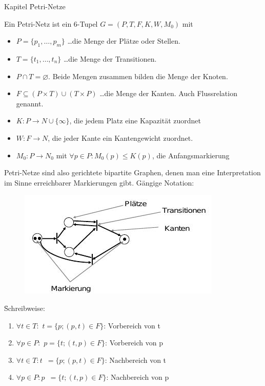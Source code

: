 \begin{chapter}{Kapitel}
\f{Petri-Netze}
\vspace*{3pt}

\noindent {}
Ein Petri-Netz ist ein 6-Tupel $G = (P,T,F,K,W,M_0)$ mit 
\begin{itemize}
 \item $P = \{p_1, \dots , p_m\}$ \dots die Menge der Plätze oder Stellen.
 \item $T = \{t_1, \dots , t_n\}$ \dots die Menge der Transitionen.
 \item $P \cap T = \varnothing$. Beide Mengen zusammen bilden die Menge der Knoten.
 \item $F \subseteq (P\times T)\cup(T\times P)$ \dots die Menge der Kanten. Auch Flussrelation genannt.
 \item $K:P \rightarrow N \cup \{\infty \}$, die jedem Platz eine Kapazität zuordnet
 \item $W:F \rightarrow N$, die jeder Kante ein Kantengewicht zuordnet.
 \item $M_0:P \rightarrow N_0$ mit $\forall p\in P:M_0(p)\leq K(p)$, die Anfangsmarkierung
\end{itemize}
Petri-Netze sind also gerichtete bipartite Graphen, denen man eine Interpretation im Sinne erreichbarer Markierungen gibt. Gängige Notation:
\begin{figure}[!ht]
 \centering
 \includegraphics[scale=0.8]{pics/petrinetz}
\end{figure}

\f{Schreibweise}:
\begin{enumerate}
 \item $\forall t\in T:$ \textbullet$t = \{p;(p,t)\in F\}$: Vorbereich von t 
 \item $\forall p\in P:$ \textbullet$p = \{t;(t,p)\in F\}$: Vorbereich von p
 \item $\forall t\in T: t$\textbullet\ $ = \{p;(p,t)\in F\}$: Nachbereich von t 
 \item $\forall p\in P: p$\textbullet\ $ = \{t;(t,p)\in F\}$: Nachbereich von p
\end{enumerate}
\newpage


\end{chapter}
